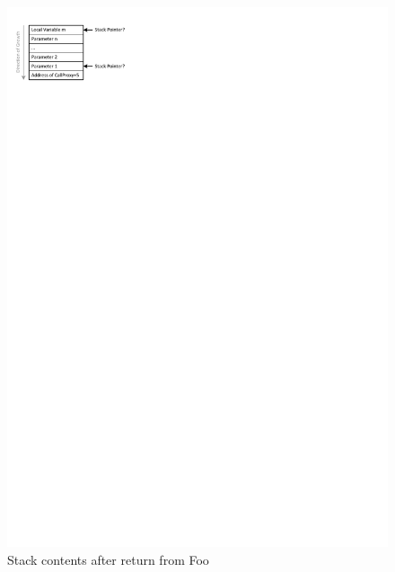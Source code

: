 \begin{figure}[htbp] 
\begin{centering} 
\includegraphics[scale=1, clip=true, viewport=0cm 25cm 7cm 30cm]{images/diagrams/EntryExitTracing_StackAt6.pdf} 
\caption{Stack contents after return from Foo} 
\label{EntryExitTracing_StackAt6} 
\end{centering} 
\end{figure}

